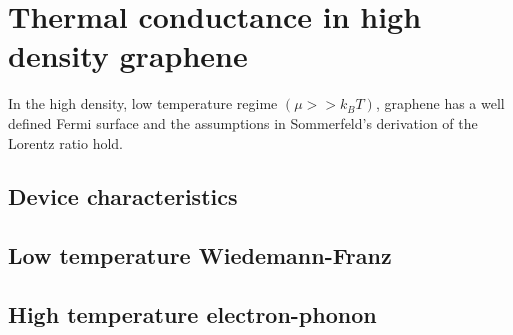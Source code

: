 \chapter{Thermal conductance in high density graphene}
\label{ch:thermal_conductance_in_high_density_graphene}
In the high density, low temperature regime $(\mu >> k_BT)$, graphene has a well defined Fermi surface and the assumptions in Sommerfeld's derivation of the Lorentz ratio hold. 

\section{Device characteristics}

\section{Low temperature Wiedemann-Franz}

\section{High temperature electron-phonon}